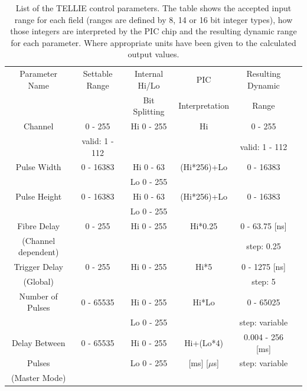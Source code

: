 \documentclass[12pt]{report}
\begin{document}

\begin{table}%
	\begin{center}
		\begin{tabular}{|c|c|c|c|c|c|}
			\hline
			Parameter Name & Settable Range & Internal Hi/Lo  & PIC & Resulting Dynamic  \\
			& & Bit Splitting & Interpretation & Range\\
			\hline
			Channel & 0 - 255 & Hi 0 - 255 & Hi & 0 - 255 \\
			& valid: 1 - 112 & & & valid: 1 - 112  \\
			\hline
			Pulse Width & 0 - 16383 & Hi 0 - 63 & (Hi*256)+Lo & 0 - 16383 \\
			& & Lo 0 - 255 & & \\
			\hline
			Pulse Height & 0 - 16383  & Hi 0 - 63 & (Hi*256)+Lo & 0 - 16383\\
			& & Lo 0 - 255 & & \\
			\hline
			Fibre Delay & 0 - 255 & Hi 0 - 255 & Hi*0.25 & 0 - 63.75 [ns] \\
			(Channel dependent) & & & & step: 0.25  \\
			\hline
			\hline
			Trigger Delay & 0 - 255 & Hi 0 - 255 & Hi*5 & 0 - 1275 [ns] \\
			(Global) & & & & step: 5  \\
			\hline
			Number of Pulses & 0 - 65535 & Hi 0 - 255 & Hi*Lo & 0 - 65025\\
			& & Lo 0 - 255 & & step: variable \\
			\hline
			Delay Between & 0 - 65535 & Hi 0 - 255 & Hi+(Lo*4) & 0.004 - 256 [ms] \\
			Pulses & & Lo 0 - 255 & [ms] [$\mu$s] & step: variable\\
			(Master Mode) & & & & \\
			\hline
		\end{tabular}
	\end{center}
	\caption{List of the TELLIE control parameters. The table shows the accepted input range for each field (ranges are defined by 8, 14 or 16 bit integer types), how those integers are interpreted by the PIC chip and the resulting dynamic range for each parameter. Where appropriate units have been given to the calculated output values.} 
	\label{tab:parrange}
\end{table}
\end{document}

